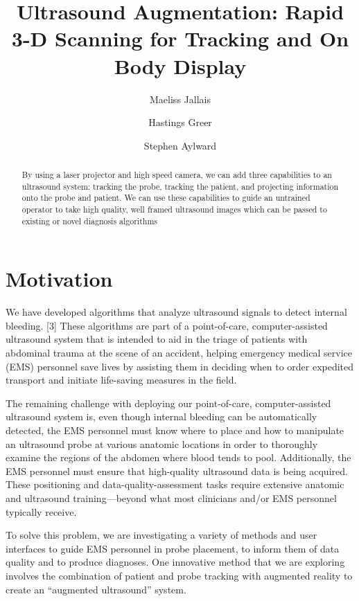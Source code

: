 \documentclass{llncs}
\begin{document}
%
\frontmatter
%
\pagestyle{headings}
\title{Ultrasound Augmentation: Rapid 3-D Scanning for Tracking and On Body Display}
\author{Maeliss Jallais \and Hastings Greer \and Stephen Aylward}
%
\mainmatter
\maketitle

\begin{abstract}
By using a laser projector and high speed camera, we can add three capabilities to an ultrasound system: tracking the probe, tracking the patient, and projecting information onto the probe and patient. We can use these capabilities to guide an untrained operator to take high quality, well framed ultrasound images which can be passed to existing or novel diagnosis algorithms
\end{abstract}


\section{Motivation}
We have developed algorithms that analyze ultrasound signals to detect internal bleeding. [3] These algorithms are part of a point-of-care, computer-assisted ultrasound system that is intended to aid in the triage of patients with abdominal trauma at the scene of an accident, helping emergency medical service (EMS) personnel save lives by assisting them in deciding when to order expedited transport and initiate life-saving measures in the field.

The remaining challenge with deploying our point-of-care, computer-assisted ultrasound system is, even though internal bleeding can be automatically detected, the EMS personnel must know where to place and how to manipulate an ultrasound probe at various anatomic locations in order to thoroughly examine the regions of the abdomen where blood tends to pool. Additionally, the EMS personnel must ensure that high-quality ultrasound data is being acquired. These positioning and data-quality-assessment tasks require extensive anatomic and ultrasound training—beyond what most clinicians and/or EMS personnel typically receive.

To solve this problem, we are investigating a variety of methods and user interfaces to guide EMS personnel in probe placement, to inform them of data quality and to produce diagnoses. One innovative method that we are exploring involves the combination of  patient and probe tracking with augmented reality to create an “augmented ultrasound” system.
\end{document}

